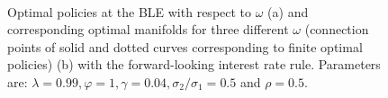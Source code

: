     \begin{figure}
    \begin{center}
          \mbox{\quad
        }
        \end{center}
   \caption{ \label{optomegatrexp}
  Optimal policies at the BLE with respect to $\omega$ (a) and corresponding optimal manifolds for three different $\omega$ (connection points of solid and dotted curves corresponding to finite optimal policies) (b) with the forward-looking interest rate rule.
   Parameters are: $\lambda=0.99, \varphi=1, \gamma=0.04, \sigma_{2}/\sigma_1=0.5$ and $\rho=0.5$. }
    \end{figure}
    

